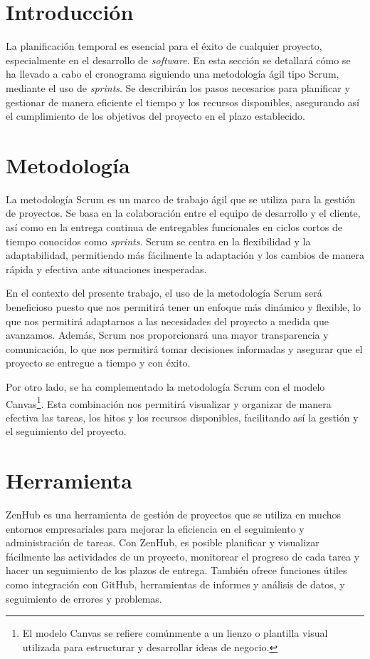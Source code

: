 

\section{Introducción}

La planificación temporal es esencial para el éxito de cualquier proyecto, especialmente en el desarrollo de \textit{software}. En esta sección se detallará cómo se ha llevado a cabo el cronograma siguiendo una metodología ágil tipo Scrum, mediante el uso de \textit{sprints}. Se describirán los pasos necesarios para planificar y gestionar de manera eficiente el tiempo y los recursos disponibles, asegurando así el cumplimiento de los objetivos del proyecto en el plazo establecido.

\section{Metodología}
La metodología Scrum es un marco de trabajo ágil que se utiliza para la gestión de proyectos. Se basa en la colaboración entre el equipo de desarrollo y el cliente, así como en la entrega continua de entregables funcionales en ciclos cortos de tiempo conocidos como \textit{sprints}. Scrum se centra en la flexibilidad y la adaptabilidad, permitiendo más fácilmente la adaptación y los cambios de manera rápida y efectiva ante situaciones inesperadas. 

En el contexto del presente trabajo, el uso de la metodología Scrum será beneficioso puesto que nos permitirá tener un enfoque más dinámico y flexible, lo que nos permitirá adaptarnos a las necesidades del proyecto a medida que avanzamos. Además, Scrum nos proporcionará una mayor transparencia y comunicación, lo que nos permitirá tomar decisiones informadas y asegurar que el proyecto se entregue a tiempo y con éxito.

Por otro lado, se ha complementado la metodología Scrum con el modelo Canvas\footnote{El modelo Canvas se refiere comúnmente a un lienzo o plantilla visual utilizada para estructurar y desarrollar ideas de negocio.}. Esta combinación nos permitirá visualizar y organizar de manera efectiva las tareas, los hitos y los recursos disponibles, facilitando así la gestión y el seguimiento del proyecto.

\section{Herramienta}
ZenHub es una herramienta de gestión de proyectos que se utiliza en muchos entornos empresariales para mejorar la eficiencia en el seguimiento y administración de tareas. Con ZenHub, es posible planificar y visualizar fácilmente las actividades de un proyecto, monitorear el progreso de cada tarea y hacer un seguimiento de los plazos de entrega. También ofrece funciones útiles como integración con GitHub, herramientas de informes y análisis de datos, y seguimiento de errores y problemas.

